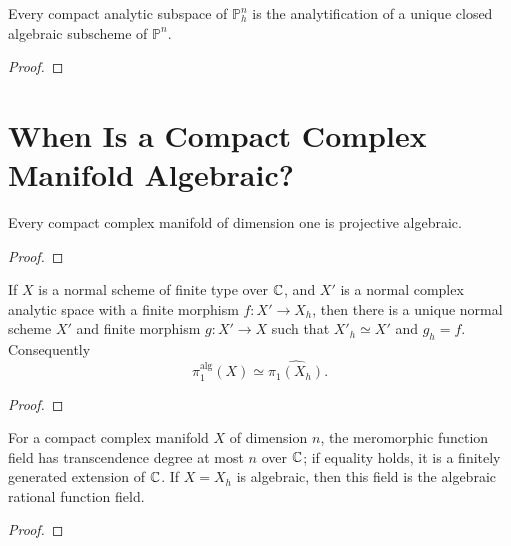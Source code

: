 \begin{theorem}[Chow]
\label{ha-appB-thm2-2}
Every compact analytic subspace of $\mathbb P^n_h$ is the analytification of
a unique closed algebraic subscheme of $\mathbb P^n$.

\end{theorem}
\begin{proof}
\notready
\end{proof}

\section{When Is a Compact Complex Manifold Algebraic?}
\label{ha-appB-sec3}

\begin{theorem}[Riemann]
\label{ha-appB-thm3-1}
Every compact complex manifold of dimension one is projective algebraic.
\end{theorem}

\begin{proof}
\notready
\end{proof}


\begin{theorem}
\label{ha-appB-thm3-2}
If $X$ is a normal scheme of finite type over $\mathbb C$, and $X'$ is a normal
complex analytic space with a finite morphism $f:X'\to X_h$, then there is a
unique normal scheme $X'$ and finite morphism $g:X'\to X$ such that
$X'_h\simeq X'$ and $g_h=f$.  Consequently
\[
\pi_1^{\mathrm{alg}}(X)\simeq\widehat{\pi_1(X_h)}.
\]
\end{theorem}
\begin{proof}
\notready
\end{proof}

\begin{proposition}[Siegel]
\label{ha-appB-prop3-3}
For a compact complex manifold $X$ of dimension $n$, the meromorphic function
field has transcendence degree at most $n$ over $\mathbb C$; if equality holds, it is
a finitely generated extension of $\mathbb C$.  If $X=X_h$ is algebraic, then this
field is the algebraic rational function field.

\end{proposition}
\begin{proof}
\notready
\end{proof}

